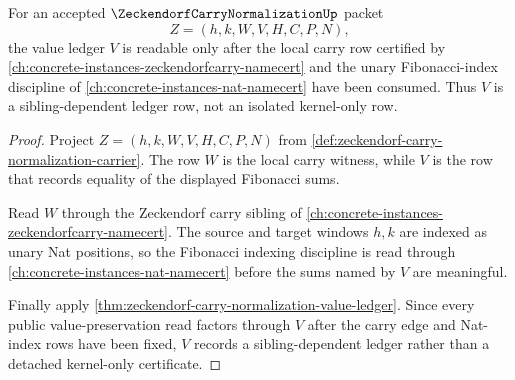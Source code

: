 \begin{theorem}
\label{thm:zeckendorf-carry-normalization-axis-nat-dependency}
For an accepted $\ZeckendorfCarryNormalizationUp$ packet
$$
Z=(h,k,W,V,H,C,P,N),
$$
the value ledger $V$ is readable only after the local carry row certified by \autoref{ch:concrete-instances-zeckendorfcarry-namecert} and the unary Fibonacci-index discipline of \autoref{ch:concrete-instances-nat-namecert} have been consumed. Thus $V$ is a sibling-dependent ledger row, not an isolated kernel-only row.
\end{theorem}
\begin{proof}
Project $Z=(h,k,W,V,H,C,P,N)$ from \autoref{def:zeckendorf-carry-normalization-carrier}. The row $W$ is the local carry witness, while $V$ is the row that records equality of the displayed Fibonacci sums.

Read $W$ through the Zeckendorf carry sibling of \autoref{ch:concrete-instances-zeckendorfcarry-namecert}. The source and target windows $h,k$ are indexed as unary Nat positions, so the Fibonacci indexing discipline is read through \autoref{ch:concrete-instances-nat-namecert} before the sums named by $V$ are meaningful.

Finally apply \autoref{thm:zeckendorf-carry-normalization-value-ledger}. Since every public value-preservation read factors through $V$ after the carry edge and Nat-index rows have been fixed, $V$ records a sibling-dependent ledger rather than a detached kernel-only certificate.
\end{proof}

